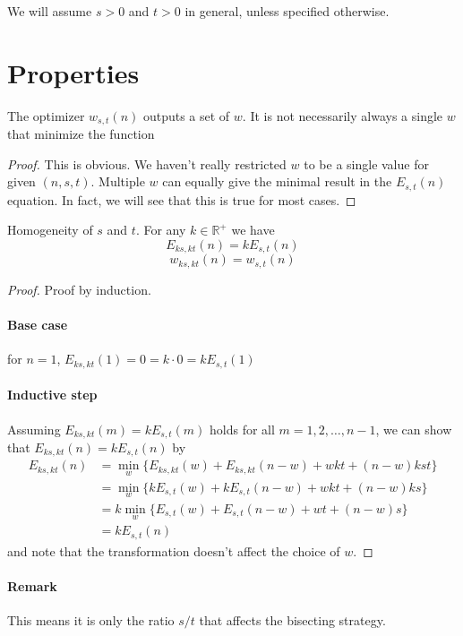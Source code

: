 \documentclass[]{article}
\begin{document}
We will assume $s > 0 $ and $t > 0$ in general, unless specified otherwise.

\section{Properties}
\vspace{1cm}
\begin{lemma}[$w$-set]
	The optimizer $w_{s,t}(n)$ outputs a set of $w$. It is not necessarily always a single $w$ that minimize the function
\end{lemma}
\begin{proof}
	This is obvious. We haven't really restricted $w$ to be a single value for given $(n,s,t)$. Multiple $w$ can equally give the minimal result in the $E_{s,t}(n)$ equation. In fact, we will see that this is true for most cases. 
\end{proof}	

\vspace{1cm}
\begin{lemma}[Homogeneity] Homogeneity of $s$ and $t$. For any $k\in\mathbb{R}^+$ we have
\[
	E_{ks,kt}(n) = k E_{s,t}(n)
\]
\[
	w_{ks,kt}(n) = w_{s,t}(n)
\]
\end{lemma}
\begin{proof}
		Proof by induction. 
	\paragraph{Base case} for $n = 1$, $E_{ks,kt}(1) = 0 = k\cdot0 = kE_{s,t}(1)$
	\paragraph{Inductive step} Assuming $E_{ks,kt}(m) = k E_{s,t}(m)$ holds for all $m = 1,2,\dots,n-1$, we can show that $E_{ks,kt}(n) = k E_{s,t}(n)$ by 
	\begin{align*}
	E_{ks,kt}(n) &= \min_{w}\{E_{ks,kt}(w) + E_{ks,kt}(n-w) + wkt +(n-w)kst\}\\
	  &= \min_{w}\{k E_{s,t}(w) + k E_{s,t}(n-w) + wkt +(n-w)ks\}\\
	  &= k\min_{w}\{E_{s,t}(w) + E_{s,t}(n-w) + wt +(n-w)s\}\\
	  &=kE_{s,t}(n)
	\end{align*}
	and note that the transformation doesn't affect the choice of $w$.
\end{proof}	
\paragraph{Remark}
This means it is only the ratio $s/t$ that affects the bisecting strategy.
\end{document}
